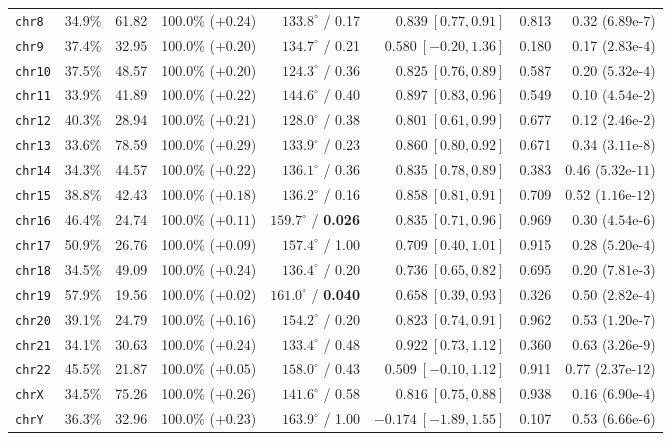 \documentclass[11pt,a4paper]{article}
\begin{document}
\begin{table}[htbp]
\begin{tabular}{@{}lrrrrrrr@{}}
\texttt{chr8}  & 34.9\% &  61.82 & 100.0\% ($+0.24$) & $133.8^\circ$ / 0.17 & $0.839\ [0.77,0.91]$ & 0.813 & 0.32 ($6.89\text{e-}7$) \\
\texttt{chr9}  & 37.4\% &  32.95 & 100.0\% ($+0.20$) & $134.7^\circ$ / 0.21 & $0.580\ [-0.20,1.36]$ & 0.180 & 0.17 ($2.83\text{e-}4$) \\
\texttt{chr10} & 37.5\% &  48.57 & 100.0\% ($+0.20$) & $124.3^\circ$ / 0.36 & $0.825\ [0.76,0.89]$ & 0.587 & 0.20 ($5.32\text{e-}4$) \\
\texttt{chr11} & 33.9\% &  41.89 & 100.0\% ($+0.22$) & $144.6^\circ$ / 0.40 & $0.897\ [0.83,0.96]$ & 0.549 & 0.10 ($4.54\text{e-}2$) \\
\texttt{chr12} & 40.3\% &  28.94 & 100.0\% ($+0.21$) & $128.0^\circ$ / 0.38 & $0.801\ [0.61,0.99]$ & 0.677 & 0.12 ($2.46\text{e-}2$) \\
\texttt{chr13} & 33.6\% &  78.59 & 100.0\% ($+0.29$) & $133.9^\circ$ / 0.23 & $0.860\ [0.80,0.92]$ & 0.671 & 0.34 ($3.11\text{e-}8$) \\
\texttt{chr14} & 34.3\% &  44.57 & 100.0\% ($+0.22$) & $136.1^\circ$ / 0.36 & $0.835\ [0.78,0.89]$ & 0.383 & 0.46 ($5.32\text{e-}11$) \\
\texttt{chr15} & 38.8\% &  42.43 & 100.0\% ($+0.18$) & $136.2^\circ$ / 0.16 & $0.858\ [0.81,0.91]$ & 0.709 & 0.52 ($1.16\text{e-}12$) \\
\texttt{chr16} & 46.4\% &  24.74 & 100.0\% ($+0.11$) & $159.7^\circ$ / \textbf{0.026} & $0.835\ [0.71,0.96]$ & 0.969 & 0.30 ($4.54\text{e-}6$) \\
\texttt{chr17} & 50.9\% &  26.76 & 100.0\% ($+0.09$) & $157.4^\circ$ / 1.00 & $0.709\ [0.40,1.01]$ & 0.915 & 0.28 ($5.20\text{e-}4$) \\
\texttt{chr18} & 34.5\% &  49.09 & 100.0\% ($+0.24$) & $136.4^\circ$ / 0.20 & $0.736\ [0.65,0.82]$ & 0.695 & 0.20 ($7.81\text{e-}3$) \\
\texttt{chr19} & 57.9\% &  19.56 & 100.0\% ($+0.02$) & $161.0^\circ$ / \textbf{0.040} & $0.658\ [0.39,0.93]$ & 0.326 & 0.50 ($2.82\text{e-}4$) \\
\texttt{chr20} & 39.1\% &  24.79 & 100.0\% ($+0.16$) & $154.2^\circ$ / 0.20 & $0.823\ [0.74,0.91]$ & 0.962 & 0.53 ($1.20\text{e-}7$) \\
\texttt{chr21} & 34.1\% &  30.63 & 100.0\% ($+0.24$) & $133.4^\circ$ / 0.48 & $0.922\ [0.73,1.12]$ & 0.360 & 0.63 ($3.26\text{e-}9$) \\
\texttt{chr22} & 45.5\% &  21.87 & 100.0\% ($+0.05$) & $158.0^\circ$ / 0.43 & $0.509\ [-0.10,1.12]$ & 0.911 & 0.77 ($2.37\text{e-}12$) \\
\texttt{chrX}  & 34.5\% &  75.26 & 100.0\% ($+0.26$) & $141.6^\circ$ / 0.58 & $0.816\ [0.75,0.88]$ & 0.938 & 0.16 ($6.90\text{e-}4$) \\
\texttt{chrY}  & 36.3\% &  32.96 & 100.0\% ($+0.23$) & $163.9^\circ$ / 1.00 & $-0.174\ [-1.89,1.55]$ & 0.107 & 0.53 ($6.66\text{e-}6$) \\
\bottomrule
\end{tabular}
\end{table}
\end{document}
